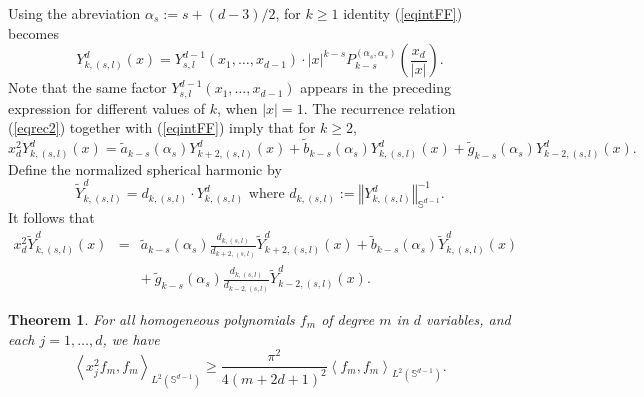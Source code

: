 \documentclass[10pt,a4paper]{amsart}
\newtheorem{theorem}{Theorem}
\begin{document}
 Using the abreviation $\alpha _{s}:=s+\left( d-3\right) /2$, for $k\geq 1$ identity (\ref{eqintFF}) becomes 
\begin{equation*}
Y_{k,\left( s,l\right) }^{d}\left( x\right) 
=
Y_{s,l}^{d-1}\left(
x_{1},\dots ,x_{d-1}\right) \cdot \left\vert x\right\vert
^{k-s}P_{k-s}^{\left( \alpha _{s},\alpha _{s}\right) }\left( \frac{x_{d}}{
\left\vert x\right\vert }\right).
\end{equation*}
Note  that the same factor $Y_{s,l}^{d-1}\left(
x_{1},\dots,x_{d-1}\right)$ appears in the preceding expression for different values of $k$, when $\left\vert x\right\vert =1$. 
The recurrence relation (\ref{eqrec2}) together with (\ref{eqintFF}) imply that for $k\ge 2$,
\begin{equation*}
x_{d}^{2}Y_{k,\left( s,l\right) }^{d}\left( x\right) =\widetilde{a}
_{k-s}\left( \alpha _{s}\right) Y_{k+2,\left( s,l\right) }^{d}\left(
x\right) +\widetilde{b}_{k-s}\left( \alpha _{s}\right) Y_{k,\left(
s,l\right) }^{d}\left( x\right) +\widetilde{g}_{k-s}\left( \alpha
_{s}\right) Y_{k-2,\left( s,l\right) }^{d}\left( x\right).
\end{equation*}
\color{red}  \color{black}
  Define the normalized spherical
harmonic by
\begin{equation*}
\widetilde{Y}_{k,\left( s,l\right) }^{d}=d_{k,\left( s,l\right) }\cdot
Y_{k,\left( s,l\right) }^{d}\text{ where }d_{k,\left( s,l\right)
}:=\left\Vert Y_{k,\left( s,l\right) }^{d}\right\Vert _{\mathbb{S}
^{d-1}}^{-1}.
\end{equation*}
It follows that 
\begin{eqnarray}
x_{d}^{2}\widetilde{Y}_{k,\left( s,l\right) }^{d}\left( x\right) &
=
&
\widetilde{a}_{k-s}\left( \alpha _{s}\right) \frac{d_{k,\left( s,l\right) }}{
d_{k+2,\left( s,l\right) }} 
\widetilde{Y}_{k+2,\left( s,l\right) }^{d}\left(
x\right) +\widetilde{b}_{k-s}\left( \alpha _{s}\right) \widetilde{Y}
_{k,\left( s,l\right) }^{d}\left( x\right)  \label{eqrell} \\
&&
+ \  \widetilde{g}_{k-s}\left( \alpha _{s}\right) 
\frac{d_{k,\left( s,l\right) }}{d_{k-2,\left( s,l\right) }}
\widetilde{Y}_{k-2,\left( s,l\right)}^{d}\left( x\right)  
\label{eqrell2}.
\end{eqnarray}

\begin{theorem} \label{arbdimBB}
	For all homogeneous polynomials $
	f_{m}$ of degree $m$ in $d$ variables, 
	and each $j = 1, \dots , d$, we have
	\begin{equation*}
		\left\langle x_{j}^{2}f_{m},f_{m}\right\rangle _{L^{2}\left( \mathbb{S}%
			^{d-1}\right) }
		\geq
		\frac{\pi ^{2}}{4\left( m+ 2 d + 1 \right)^{2}}
		\left
		\langle
		f_{m},f_{m}\right\rangle _{L^{2}\left( \mathbb{S}^{d-1}\right) }.
	\end{equation*}
\end{theorem}
\end{document}

